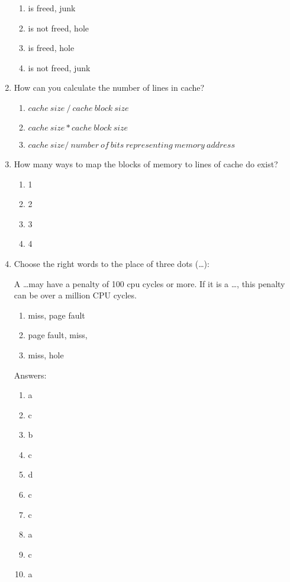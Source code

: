 \documentclass[paper=8.2in:11.6in]{scrartcl}
\begin{document}
\begin{enumerate}
\begin{enumerate}[label=\alph*)]
\item is freed, junk
\item is not freed, hole
\item is freed, hole
\item is not freed, junk

\end{enumerate}

\item How can you calculate the number of lines in cache?

\begin{enumerate}[label=\alph*)]

\item $cache \ size \  / \  cache \ block \ size$
\item $cache \ size * cache \ block \ size$
\item $cache \ size / \ number \ of \ bits \ representing \ memory \ address$

\end{enumerate}

\item How many ways to map the blocks of memory to lines of cache do exist?

\begin{enumerate}[label=\alph*)]

\item 1
\item 2
\item 3
\item 4

\end{enumerate}

\item Choose the right words to the place of three dots (\ldots):

A \ldots may have a penalty of 100 cpu cycles or more. If it is a \ldots , this penalty can be over a million CPU cycles.

\begin{enumerate}[label=\alph*)]

\item miss, page fault
\item page fault, miss,
\item miss, hole

\end{enumerate}

\newpage


Answers:

\begin{enumerate}[label=\arabic*)]

\item a
\item c
\item b
\item c
\item d
\item c
\item c
\item a
\item c
\item a


\end{enumerate}

\end{enumerate}
\end{document}
